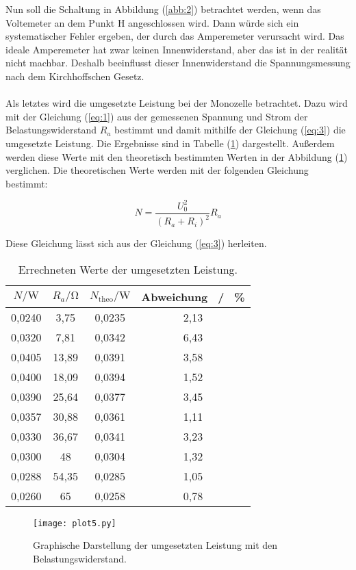 Nun soll die Schaltung in Abbildung (\ref{abb:2}) betrachtet werden, wenn das Voltemeter an
dem Punkt H angeschlossen wird. Dann würde sich ein systematischer Fehler ergeben, der
durch das Amperemeter verursacht wird. Das ideale Amperemeter hat zwar keinen Innenwiderstand,
aber das ist in der realität nicht machbar. Deshalb beeinflusst dieser Innenwiderstand
die Spannungsmessung nach dem Kirchhoffschen Gesetz.\\\\

Als letztes wird die umgesetzte Leistung bei der Monozelle betrachtet. Dazu wird mit der
Gleichung (\ref{eq:1}) aus der gemessenen Spannung und Strom der Belastungswiderstand $R_a$ bestimmt
und damit mithilfe der Gleichung (\ref{eq:3}) die umgesetzte Leistung. Die Ergebnisse sind
in Tabelle (\ref{tab:5}) dargestellt. Außerdem werden diese Werte mit den theoretisch
bestimmten Werten in der Abbildung (\ref{abb:8}) verglichen. Die theoretischen Werte
werden mit der folgenden Gleichung bestimmt:

\begin{equation*}
  N = \frac{U_0^2}{(R_a + R_i)^2} R_a
\end{equation*}

Diese Gleichung lässt sich aus der Gleichung (\ref{eq:3}) herleiten.

\begin{table}[H]
  \centering
  \caption{Errechneten Werte der umgesetzten Leistung.}
  \label{tab:5}
  \begin{tabular}{c c c c}
    \toprule
    $N /\si{\watt}$ & $R_a / \si{\ohm}$ & $N_{\text{theo}} / \si{\watt}$ & Abweichung \, / \, \% \\
    \midrule
    0,0240 & 3,75  & 0,0235 & 2,13 \\
    0,0320 & 7,81  & 0,0342 & 6,43 \\
    0,0405 & 13,89 & 0,0391 & 3,58 \\
    0,0400 & 18,09 & 0,0394 & 1,52 \\
    0,0390 & 25,64 & 0,0377 & 3,45 \\
    0,0357 & 30,88 & 0,0361 & 1,11 \\
    0,0330 & 36,67 & 0,0341 & 3,23 \\
    0,0300 & 48    & 0,0304 & 1,32 \\
    0,0288 & 54,35 & 0,0285 & 1,05 \\
    0,0260 & 65    & 0,0258 & 0,78 \\
    \bottomrule
  \end{tabular}
\end{table}

\begin{figure}[H]
  \centering
  \texttt{[image: plot5.py]}
  \caption{Graphische Darstellung der umgesetzten Leistung mit den Belastungswiderstand.}
  \label{abb:8}
\end{figure}
